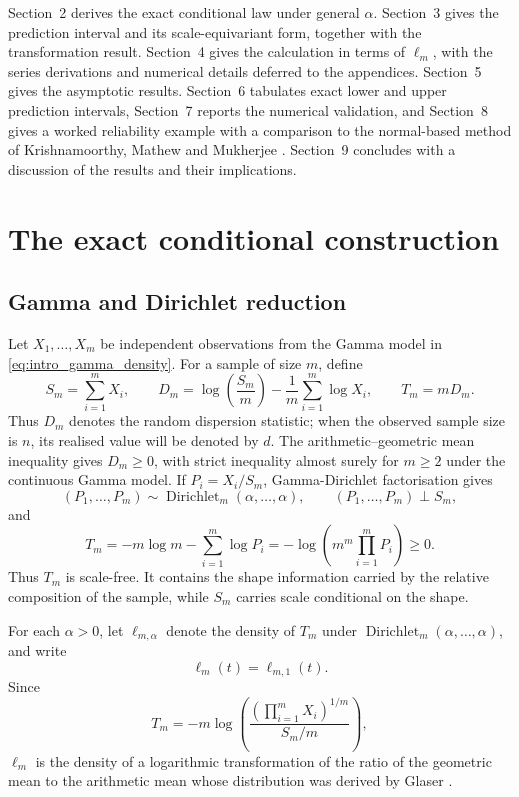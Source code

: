 \documentclass[11pt]{article}
\theoremstyle{remark}
\newcommand{\Dir}{\operatorname{Dirichlet}}
\begin{document}
Section~2 derives the exact conditional law under general $\alpha$. 
Section~3 gives the prediction interval and its scale-equivariant form, together with the transformation result. 
Section~4 gives the calculation in terms of $\ell_m$, with the series derivations and 
numerical details deferred to the appendices. 
Section~5 gives the asymptotic results. 
Section~6 tabulates exact lower and upper prediction intervals, 
Section~7 reports the numerical validation, and Section~8 gives a worked reliability example with a comparison to the normal-based method of Krishnamoorthy, Mathew and Mukherjee \cite{Krishnamoorthy2008}.
Section~9 concludes with a discussion of the results and their implications.

\section{The exact conditional construction}
\subsection{Gamma and Dirichlet reduction}

Let $X_1,\ldots,X_m$ be independent observations from the Gamma model in \eqref{eq:intro_gamma_density}. For a sample of size $m$, define
\begin{equation}
 S_m=\sum_{i=1}^m X_i,
 \qquad
 D_m=\log\!\left(\frac{S_m}{m}\right)-\frac1m\sum_{i=1}^m\log X_i,
 \qquad
 T_m=mD_m.
 \label{eq:statistics}
\end{equation}
Thus $D_m$ denotes the random dispersion statistic; when the observed sample size is $n$, its realised value will be denoted by $d$. The arithmetic--geometric mean inequality gives $D_m\ge0$, with strict inequality almost surely for $m\ge2$ under the continuous Gamma model.
If $P_i=X_i/S_m$, Gamma-Dirichlet factorisation gives
\begin{equation}
 (P_1,\ldots,P_m)\sim\Dir_m(\alpha,\ldots,\alpha),
 \qquad
 (P_1,\ldots,P_m)\perp S_m,
 \label{eq:dirichlet_factor}
\end{equation}
and
\begin{equation}
 T_m=-m\log m-\sum_{i=1}^m\log P_i
     =-\log\!\left(m^m\prod_{i=1}^m P_i\right)\ge0.
 \label{eq:T_product}
\end{equation}
Thus $T_m$ is scale-free. It contains the shape information carried by the relative composition of the sample, while $S_m$ carries scale conditional on the shape.

For each $\alpha>0$, let $\ell_{m,\alpha}$ denote the density of $T_m$ under $\Dir_m(\alpha,\ldots,\alpha)$, and write
\begin{equation}
 \ell_m(t)=\ell_{m,1}(t).
 \label{eq:ell_definition}
\end{equation}
Since
\[
 T_m=-m\log\!\left(
 \frac{(\prod_{i=1}^m X_i)^{1/m}}{S_m/m}
 \right),
\]
$\ell_m$ is the density of a logarithmic transformation of the ratio of the geometric mean to the arithmetic mean whose distribution was derived by Glaser \cite{Glaser1976}.
\end{document}
